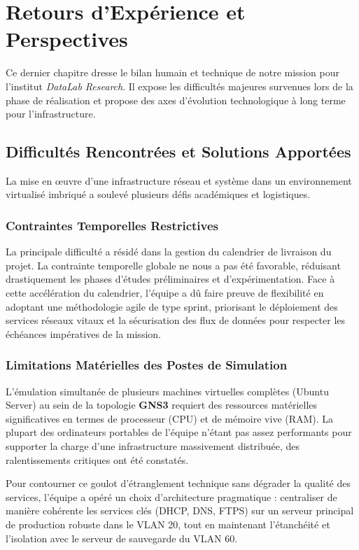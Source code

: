 \chapter{Retours d'Expérience et Perspectives}
\label{chap:retours_experience_perspectives}

Ce dernier chapitre dresse le bilan humain et technique de notre mission pour l'institut \textit{DataLab Research}. Il expose les difficultés majeures survenues lors de la phase de réalisation et propose des axes d'évolution technologique à long terme pour l'infrastructure.

\section{Difficultés Rencontrées et Solutions Apportées}
La mise en œuvre d'une infrastructure réseau et système dans un environnement virtualisé imbriqué a soulevé plusieurs défis académiques et logistiques.

\subsection{Contraintes Temporelles Restrictives}
La principale difficulté a résidé dans la gestion du calendrier de livraison du projet. La contrainte temporelle globale ne nous a pas été favorable, réduisant drastiquement les phases d'études préliminaires et d'expérimentation. Face à cette accélération du calendrier, l'équipe a dû faire preuve de flexibilité en adoptant une méthodologie agile de type sprint, priorisant le déploiement des services réseaux vitaux et la sécurisation des flux de données pour respecter les échéances impératives de la mission.

\subsection{Limitations Matérielles des Postes de Simulation}
L'émulation simultanée de plusieurs machines virtuelles complètes (Ubuntu Server) au sein de la topologie \textbf{GNS3} requiert des ressources matérielles significatives en termes de processeur (CPU) et de mémoire vive (RAM). La plupart des ordinateurs portables de l'équipe n'étant pas assez performants pour supporter la charge d'une infrastructure massivement distribuée, des ralentissements critiques ont été constatés. 

Pour contourner ce goulot d'étranglement technique sans dégrader la qualité des services, l'équipe a opéré un choix d'architecture pragmatique : centraliser de manière cohérente les services clés (DHCP, DNS, FTPS) sur un serveur principal de production robuste dans le VLAN 20, tout en maintenant l'étanchéité et l'isolation avec le serveur de sauvegarde du VLAN 60.

